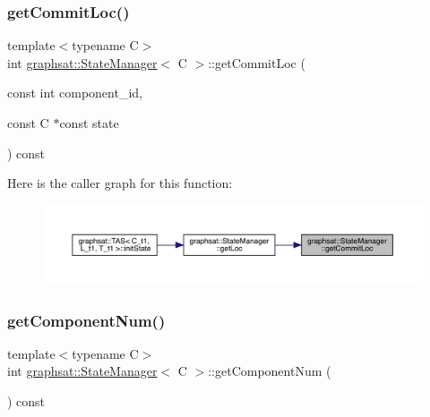 \mbox{\label{classgraphsat_1_1_state_manager_a0b406447edcfd0df6a8634f8928b5db1}} 
\subsubsection{\texorpdfstring{getCommitLoc()}{getCommitLoc()}}
{\footnotesize\ttfamily template$<$typename C$>$ \\
int \mbox{\hyperlink{classgraphsat_1_1_state_manager}{graphsat\+::\+State\+Manager}}$<$ C $>$\+::get\+Commit\+Loc (\begin{DoxyParamCaption}\item[{const int}]{component\+\_\+id,  }\item[{const C $\ast$const}]{state }\end{DoxyParamCaption}) const\hspace{0.3cm}{\ttfamily [inline]}}

Here is the caller graph for this function\+:
\nopagebreak
\begin{figure}[H]
\begin{center}
\leavevmode
\includegraphics[width=350pt]{classgraphsat_1_1_state_manager_a0b406447edcfd0df6a8634f8928b5db1_icgraph}
\end{center}
\end{figure}
\mbox{\label{classgraphsat_1_1_state_manager_abdc84b2d02bfc0fb7532cbf28456ac8f}} 
\subsubsection{\texorpdfstring{getComponentNum()}{getComponentNum()}}
{\footnotesize\ttfamily template$<$typename C$>$ \\
int \mbox{\hyperlink{classgraphsat_1_1_state_manager}{graphsat\+::\+State\+Manager}}$<$ C $>$\+::get\+Component\+Num (\begin{DoxyParamCaption}{ }\end{DoxyParamCaption}) const\hspace{0.3cm}{\ttfamily [inline]}}

